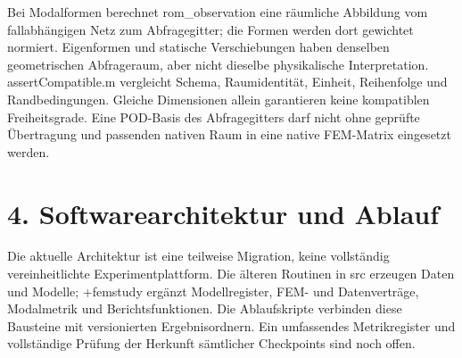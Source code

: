 \documentclass[11pt,a4paper]{article}
\begin{document}
Bei Modalformen berechnet rom\_\allowbreak{}observation eine räumliche Abbildung vom fallabhängigen Netz zum Abfragegitter; die Formen werden dort gewichtet normiert. Eigenformen und statische Verschiebungen haben denselben geometrischen Abfrageraum, aber nicht dieselbe physikalische Interpretation. assertCompatible.m vergleicht Schema, Raumidentität, Einheit, Reihenfolge und Randbedingungen. Gleiche Dimensionen allein garantieren keine kompatiblen Freiheitsgrade. Eine POD-Basis des Abfragegitters darf nicht ohne geprüfte Übertragung und passenden nativen Raum in eine native FEM-Matrix eingesetzt werden.

\section{4. Softwarearchitektur und Ablauf}
Die aktuelle Architektur ist eine teilweise Migration, keine vollständig vereinheitlichte Experimentplattform. Die älteren Routinen in src erzeugen Daten und Modelle; +femstudy ergänzt Modellregister, FEM- und Datenverträge, Modalmetrik und Berichtsfunktionen. Die Ablaufskripte verbinden diese Bausteine mit versionierten Ergebnisordnern. Ein umfassendes Metrikregister und vollständige Prüfung der Herkunft sämtlicher Checkpoints sind noch offen.
\end{document}
